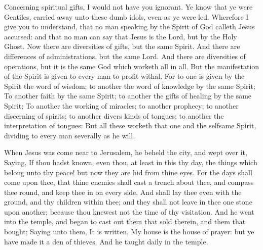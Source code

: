  Concerning spiritual gifts, I would not have you ignorant. Ye know that ye were Gentiles, carried away unto these dumb idols, even as ye were led. Wherefore I give you to understand, that no man speaking by the Spirit of God calleth Jesus accursed: and that no man can say that Jesus is the Lord, but by the Holy Ghost. Now there are diversities of gifts, but the same Spirit. And there are differences of administrations, but the same Lord. And there are diversities of operations, but it is the same God which worketh all in all. But the manifestation of the Spirit is given to every man to profit withal. For to one is given by the Spirit the word of wisdom; to another the word of knowledge by the same Spirit; To another faith by the same Spirit; to another the gifts of healing by the same Spirit; To another the working of miracles; to another prophecy; to another discerning of spirits; to another divers kinds of tongues; to another the interpretation of tongues: But all these worketh that one and the selfsame Spirit, dividing to every man severally as he will.


 When Jesus was come near to Jerusalem, he beheld the city, and wept over it, Saying, If thou hadst known, even thou, at least in this thy day, the things which belong unto thy peace! but now they are hid from thine eyes. For the days shall come upon thee, that thine enemies shall cast a trench about thee, and compass thee round, and keep thee in on every side, And shall lay thee even with the ground, and thy children within thee; and they shall not leave in thee one stone upon another; because thou knewest not the time of thy visitation. And he went into the temple, and began to cast out them that sold therein, and them that bought; Saying unto them, It is written, My house is the house of prayer: but ye have made it a den of thieves. And he taught daily in the temple.


